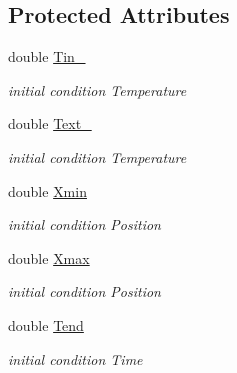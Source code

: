\subsection*{Protected Attributes}
\begin{DoxyCompactItemize}
\item 
\mbox{\label{class_heat_conduction_a2487010bf67582643ff59c0c5167725e}} 
double \hyperlink{class_heat_conduction_a2487010bf67582643ff59c0c5167725e}{Tin\+\_}
\begin{DoxyCompactList}\small\item\em initial condition Temperature \end{DoxyCompactList}\item 
\mbox{\label{class_heat_conduction_aeb50fb3189fd6545f765ef73c9be7889}} 
double \hyperlink{class_heat_conduction_aeb50fb3189fd6545f765ef73c9be7889}{Text\+\_}
\begin{DoxyCompactList}\small\item\em initial condition Temperature \end{DoxyCompactList}\item 
\mbox{\label{class_heat_conduction_a6ccf374e13ab91b2403db617c9e7a8f0}} 
double \hyperlink{class_heat_conduction_a6ccf374e13ab91b2403db617c9e7a8f0}{Xmin}
\begin{DoxyCompactList}\small\item\em initial condition Position \end{DoxyCompactList}\item 
\mbox{\label{class_heat_conduction_a187dd05134300536dd9b5418e2957e9a}} 
double \hyperlink{class_heat_conduction_a187dd05134300536dd9b5418e2957e9a}{Xmax}
\begin{DoxyCompactList}\small\item\em initial condition Position \end{DoxyCompactList}\item 
\mbox{\label{class_heat_conduction_ab1d00caf79f4c04b420189eaf7c666e1}} 
double \hyperlink{class_heat_conduction_ab1d00caf79f4c04b420189eaf7c666e1}{Tend}
\begin{DoxyCompactList}\small\item\em initial condition Time \end{DoxyCompactList}\item 

\end{DoxyCompactItemize}
